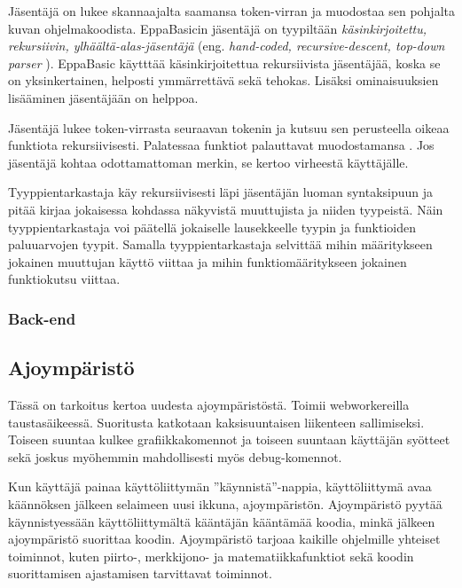 Jäsentäjä on lukee skannaajalta saamansa token-virran ja muodostaa sen pohjalta kuvan ohjelmakoodista.
EppaBasicin jäsentäjä on tyypiltään \emph{käsinkirjoitettu, rekursiivin, ylhäältä-alas-jäsentäjä}
(eng. \emph{hand-coded, recursive-descent, top-down parser} \cite[kappale 3.3.2]{eac2e}).
EppaBasic käytttää käsinkirjoitettua rekursiivista jäsentäjää,
koska se on yksinkertainen, helposti ymmärrettävä sekä tehokas.
Lisäksi ominaisuuksien lisääminen jäsentäjään on helppoa.

Jäsentäjä lukee token-virrasta seuraavan tokenin ja kutsuu sen perusteella
oikeaa funktiota rekursiivisesti.
Palatessaa funktiot palauttavat muodostamansa .
Jos jäsentäjä kohtaa odottamattoman merkin, se kertoo virheestä käyttäjälle.

Tyyppientarkastaja käy rekursiivisesti läpi jäsentäjän luoman syntaksipuun
ja pitää kirjaa jokaisessa kohdassa näkyvistä muuttujista ja niiden tyypeistä.
Näin tyyppientarkastaja voi päätellä jokaiselle lausekkeelle tyypin
ja funktioiden paluuarvojen tyypit.
Samalla tyyppientarkastaja selvittää mihin määritykseen jokainen muuttujan käyttö viittaa
ja mihin funktiomääritykseen jokainen funktiokutsu viittaa.

\subsubsection{Back-end}

\subsection{Ajoympäristö}
\begin{anfxnote}{}
Tässä on tarkoitus kertoa uudesta ajoympäristöstä.
Toimii webworkereilla taustasäikeessä.
Suoritusta katkotaan kaksisuuntaisen liikenteen sallimiseksi.
Toiseen suuntaa kulkee grafiikkakomennot ja toiseen suuntaan
käyttäjän syötteet sekä joskus myöhemmin mahdollisesti
myös debug-komennot.
\end{anfxnote}

Kun käyttäjä painaa käyttöliittymän ''käynnistä''-nappia,
käyttöliittymä avaa käännöksen jälkeen selaimeen uusi ikkuna,
ajoympäristön.
Ajoympäristö pyytää käynnistyessään käyttöliittymältä kääntäjän kääntämää koodia,
minkä jälkeen ajoympäristö suorittaa koodin.
Ajoympäristö tarjoaa kaikille ohjelmille yhteiset toiminnot,
kuten piirto-, merkkijono- ja matematiikkafunktiot
sekä koodin suorittamisen ajastamisen tarvittavat toiminnot.

